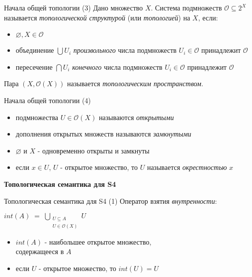 \documentclass{beamer}
\begin{document}
\begin{frame}{Начала общей топологии (3)}
Дано множество $X$. Система подмножеств $\mathcal{O} \subseteq 2^X$ называется \textit{топологической структурой} (или \textit{топологией}) на $X$, если:\\
\bigskip
\begin{itemize}
	\item $\varnothing, X \in \mathcal{O}$
	\item объединение $\bigcup U_i$ \textit{произвольного} числа подмножеств $U_i \in \mathcal{O}$ принадлежит $\mathcal{O}$
	\item пересечение $\bigcap U_i$ \textit{конечного} числа подмножеств $U_i \in \mathcal{O}$ принадлежит $\mathcal{O}$
\end{itemize}
\bigskip
Пара $(X, \mathcal{O}(X))$ называется \textit{топологическим пространством}.
\end{frame}

\begin{frame}{Начала общей топологии (4)}
\begin{itemize}
	\item подмножества $U \in \mathcal{O}(X)$ называются \textit{открытыми}
	\item дополнения открытых множеств называются \textit{замкнутыми}
	\item $\varnothing$ и $X$ - одновременно открыты и замкнуты
	\item если $x \in U$, $U$ - открытое множество, то $U$ называется \textit{окрестностью} $x$
\end{itemize}
\end{frame}

\begin{frame}{}
\begin{center}
	\textbf{Топологическая семантика для S4}
\end{center}
\end{frame}

\begin{frame}{Топологическая семантика для S4 (1)}
Оператор взятия \textit{внутренности}:\\
\bigskip
\begin{center}
	    $\displaystyle int(A) \; = \; \bigcup_{\substack{U \subseteq A\\U \in \mathcal{O}(X)}}{U}$
\end{center}
\bigskip
\begin{itemize}
	\item $int(A)$ - наибольшее открытое множество, \\содержащееся в $A$
	\item если $U$ - открытое множество, то $int(U) = U$
\end{itemize}
\end{frame}
\end{document}
